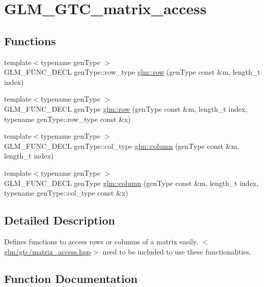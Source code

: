 \hypertarget{group__gtc__matrix__access}{}\section{G\+L\+M\+\_\+\+G\+T\+C\+\_\+matrix\+\_\+access}
\label{group__gtc__matrix__access}
\subsection*{Functions}
\begin{DoxyCompactItemize}
\item 
{\footnotesize template$<$typename gen\+Type $>$ }\\G\+L\+M\+\_\+\+F\+U\+N\+C\+\_\+\+D\+E\+C\+L gen\+Type\+::row\+\_\+type \hyperlink{group__gtc__matrix__access_ga259e5ebd0f31ec3f83440f8cae7f5dba}{glm\+::row} (gen\+Type const \&m, length\+\_\+t index)
\item 
{\footnotesize template$<$typename gen\+Type $>$ }\\G\+L\+M\+\_\+\+F\+U\+N\+C\+\_\+\+D\+E\+C\+L gen\+Type \hyperlink{group__gtc__matrix__access_gaadcc64829aadf4103477679e48c7594f}{glm\+::row} (gen\+Type const \&m, length\+\_\+t index, typename gen\+Type\+::row\+\_\+type const \&x)
\item 
{\footnotesize template$<$typename gen\+Type $>$ }\\G\+L\+M\+\_\+\+F\+U\+N\+C\+\_\+\+D\+E\+C\+L gen\+Type\+::col\+\_\+type \hyperlink{group__gtc__matrix__access_ga96022eb0d3fae39d89fc7a954e59b374}{glm\+::column} (gen\+Type const \&m, length\+\_\+t index)
\item 
{\footnotesize template$<$typename gen\+Type $>$ }\\G\+L\+M\+\_\+\+F\+U\+N\+C\+\_\+\+D\+E\+C\+L gen\+Type \hyperlink{group__gtc__matrix__access_ga9e757377523890e8b80c5843dbe4dd15}{glm\+::column} (gen\+Type const \&m, length\+\_\+t index, typename gen\+Type\+::col\+\_\+type const \&x)
\end{DoxyCompactItemize}


\subsection{Detailed Description}
Defines functions to access rows or columns of a matrix easily. $<$\hyperlink{matrix__access_8hpp}{glm/gtc/matrix\+\_\+access.\+hpp}$>$ need to be included to use these functionalities. 

\subsection{Function Documentation}
\hypertarget{group__gtc__matrix__access_ga96022eb0d3fae39d89fc7a954e59b374}{}

